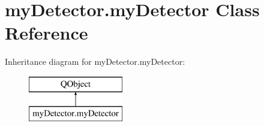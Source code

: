 \hypertarget{classmyDetector_1_1myDetector}{\section{my\-Detector.\-my\-Detector Class Reference}
\label{classmyDetector_1_1myDetector}
}
Inheritance diagram for my\-Detector.\-my\-Detector\-:\begin{figure}[H]
\begin{center}
\leavevmode
\includegraphics[height=2.000000cm]{classmyDetector_1_1myDetector}
\end{center}
\end{figure}
